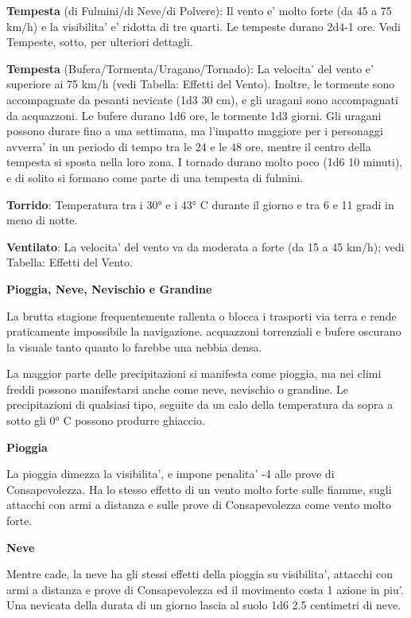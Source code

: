 \documentclass[a4paper,11pt,twoside,openany]{book}
\begin{document}
{\textbf{Tempesta} (di Fulmini/di Neve/di Polvere): Il vento e' molto forte (da 45 a 75 km/h) e la visibilita' e' ridotta di tre quarti. Le tempeste durano 2d4-1 ore. Vedi Tempeste, sotto, per ulteriori dettagli.

\textbf{Tempesta} (Bufera/Tormenta/Uragano/Tornado): La velocita' del vento e' superiore ai 75 km/h (vedi Tabella: Effetti del Vento). Inoltre, le tormente sono accompagnate da pesanti nevicate (1d3 \texttimes{} 30 cm), e gli uragani sono accompagnati da acquazzoni. Le bufere durano 1d6 ore, le tormente 1d3 giorni. Gli uragani possono durare fino a una settimana, ma l'impatto maggiore per i personaggi avverra' in un periodo di tempo tra le 24 e le 48 ore, mentre il centro della tempesta si sposta nella loro zona. I tornado durano molto poco (1d6 \texttimes{} 10 minuti), e di solito si formano come parte di una tempesta di fulmini.

\textbf{Torrido}: Temperatura tra i 30° e i 43° C durante il giorno e tra 6 e 11 gradi in meno di notte.

\textbf{Ventilato}: La velocita' del vento va da moderata a forte (da 15 a 45 km/h); vedi Tabella: Effetti del Vento.

\textbf{Pioggia, Neve, Nevischio e Grandine}

La brutta stagione frequentemente rallenta o blocca i trasporti via terra e rende praticamente impossibile la navigazione. acquazzoni torrenziali e bufere oscurano la visuale tanto quanto lo farebbe una nebbia densa.

La maggior parte delle precipitazioni si manifesta come pioggia, ma nei climi freddi possono manifestarsi anche come neve, nevischio o grandine. Le precipitazioni di qualsiasi tipo, seguite da un calo della temperatura da sopra a sotto gli 0° C possono produrre ghiaccio.

\textbf{Pioggia}

La pioggia dimezza la visibilita', e impone penalita' -4 alle prove di Consapevolezza. Ha lo stesso effetto di un vento molto forte sulle fiamme, sugli attacchi con armi a distanza e sulle prove di Consapevolezza come vento molto forte.

\textbf{Neve}

Mentre cade, la neve ha gli stessi effetti della pioggia su visibilita', attacchi con armi a distanza e prove di Consapevolezza ed il movimento costa 1 azione in piu'. Una nevicata della durata di un giorno lascia al suolo 1d6 \texttimes{} 2.5 centimetri di neve.

}
\end{document}
